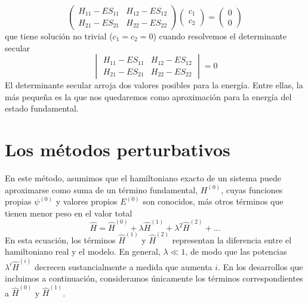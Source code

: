 \begin{equation}
\begin{pmatrix}
 H_{11}-ES_{11} &  H_{12}-ES_{12}  \\ 
 H_{21}-ES_{21} &  H_{22}-ES_{22}
\end{pmatrix}
\begin{pmatrix}
c_{1}  \\ 
c_{2}
\end{pmatrix}=
\begin{pmatrix}
0\\
0
\end{pmatrix}
\end{equation}
que tiene solución no trivial ($c_1=c_2=0$) cuando resolvemos 
el determinante secular 
\begin{equation}
\begin{vmatrix}
 H_{11}-ES_{11} &  H_{12}-ES_{12}  \\ 
 H_{21}-ES_{21} &  H_{22}-ES_{22}
\end{vmatrix}= 0
\end{equation}
El determinante secular arroja dos valores posibles
para la energía. Entre ellas, la más pequeña es 
la que nos quedaremos como aproximación para la energía
del estado fundamental.

\section{Los métodos perturbativos}
En este método, asumimos que el hamiltoniano exacto de 
un sistema puede aproximarse como suma de un término 
fundamental, $H^{(0)}$, cuyas funciones propias 
$\psi^{(0)}$ y valores propios $E^{(0)}$ son conocidos,
más otros términos que tienen menor peso en el valor total 
\begin{equation}
    \hat{H}=\hat{H}^{(0)} + \lambda\hat{H}^{(1)} + 
    \lambda^2 \hat{H}^{(2)} + ...
    \label{eq:H_pert}
\end{equation}
En esta ecuación, los términos $\hat{H}^{(1)}$ y 
$\hat{H}^{(2)}$ representan la diferencia entre el
hamiltoniano real y el modelo. En general,
$\lambda \ll 1$, de modo que las potencias
$\lambda^i\hat{H}^{(i)}$ decrecen sustancialmente 
a medida que aumenta $i$. En los desarrollos que 
incluimos a continuación, consideramos únicamente los
términos correspondientes a $\hat{H}^{(0)}$ y 
$\hat{H}^{(1)}$.

